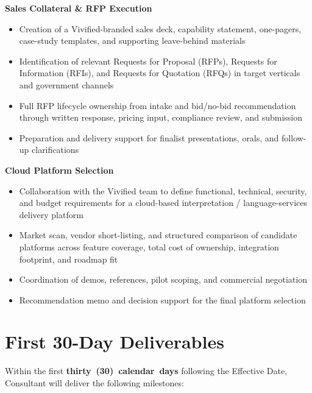 \documentclass{toospoint}
\begin{document}
\vspace{4pt}
\noindent\textbf{\color{TPDark}Sales Collateral \& RFP Execution}
\begin{itemize}[leftmargin=1.5em, itemsep=2pt, topsep=2pt]
  \item Creation of a Vivified-branded sales deck, capability statement, one-pagers, case-study templates, and supporting leave-behind materials
  \item Identification of relevant Requests for Proposal (RFPs), Requests for Information (RFIs), and Requests for Quotation (RFQs) in target verticals and government channels
  \item Full RFP lifecycle ownership from intake and bid/no-bid recommendation through written response, pricing input, compliance review, and submission
  \item Preparation and delivery support for finalist presentations, orals, and follow-up clarifications
\end{itemize}

\vspace{4pt}
\noindent\textbf{\color{TPDark}Cloud Platform Selection}
\begin{itemize}[leftmargin=1.5em, itemsep=2pt, topsep=2pt]
  \item Collaboration with the Vivified team to define functional, technical, security, and budget requirements for a cloud-based interpretation / language-services delivery platform
  \item Market scan, vendor short-listing, and structured comparison of candidate platforms across feature coverage, total cost of ownership, integration footprint, and roadmap fit
  \item Coordination of demos, references, pilot scoping, and commercial negotiation
  \item Recommendation memo and decision support for the final platform selection
\end{itemize}

\section{First 30-Day Deliverables}

Within the first \textbf{thirty~(30)~calendar~days} following the Effective Date,
Consultant will deliver the following milestones:
\end{document}
